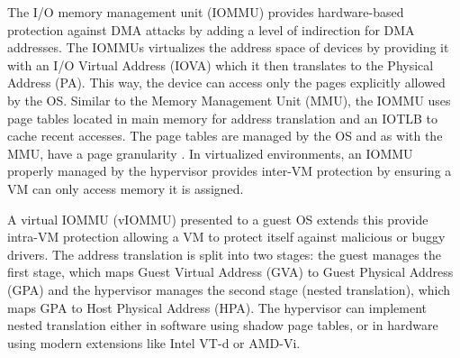 
The I/O memory management unit (IOMMU) provides hardware-based protection against DMA attacks 
    by adding a level of indirection for DMA addresses. 
The IOMMUs virtualizes the address space of devices by providing it with an I/O Virtual Address (IOVA) 
    which it then translates to the Physical Address (PA). 
This way, the device can access only the pages explicitly allowed by the OS. 
Similar to the Memory Management Unit (MMU), the IOMMU uses page tables 
    located in main memory for address translation 
    and an IOTLB to cache recent accesses. 
The page tables are managed by the OS and as with the MMU, 
    have a page granularity \cite{AlexCodeInjection}. 
In virtualized environments, an IOMMU properly managed by the hypervisor 
    provides inter-VM protection by ensuring a VM can only access memory it is assigned. 

A virtual IOMMU (vIOMMU)\cite{Amit2011vIOMMU} presented to a guest OS extends this provide intra-VM protection 
    allowing a VM to protect itself against malicious or buggy drivers. 
The address translation is split into two stages: the guest  manages the first stage, 
    which maps Guest Virtual Address (GVA) to Guest Physical Address (GPA) 
    and the hypervisor manages the second stage (nested translation), 
    which maps GPA to Host Physical Address (HPA). 
The hypervisor can implement nested translation either in software using shadow page tables, 
    or in hardware using modern extensions like Intel VT-d or AMD-Vi. 
\fi 